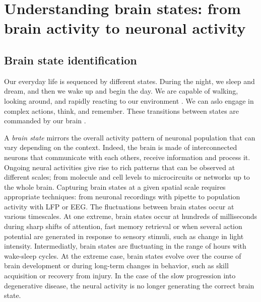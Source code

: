  
\newpage

%
\section{Understanding brain states: from brain activity to neuronal activity}

\subsection{Brain state identification}
Our everyday life is sequenced by different states. During the night, we sleep and dream,  and then we wake up and begin the day. We are capable of walking, looking around, and rapidly reacting to our environment . We can aslo engage in complex actions, think, and remember. These transitions between states are commanded by our brain \citep{bradley_state-dependent_2022}. 

A \textit{brain state} mirrors the overall activity pattern of neuronal population that can vary depending on the context. Indeed, the brain is made of interconnected neurons that communicate with each others, receive information and process it. Ongoing neural activities give rise to rich patterns that can be observed at different scales; from molecule and cell levels to microcircuits or networks up to the whole brain. Capturing brain states at a given spatial scale requires appropriate techniques: from neuronal recordings with pipette to population activity with LFP or EEG. The fluctuations between brain states occur at various timescales. At one extreme, brain states occur at hundreds of milliseconds during sharp shifts of attention, fast memory retrieval or when several action potential are generated in response to sensory stimuli, such as change in light intensity. Intermediatly, brain states are fluctuating in the range of hours with wake-sleep cycles. At the extreme case, brain states evolve over the course of brain development or during long-term changes in behavior, such as skill acquisition or recovery from injury. In the case of the slow progression into degenerative disease, the neural activity is no longer generating the correct brain state.

